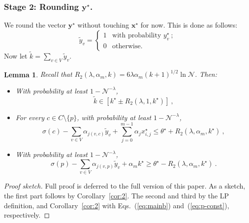 \documentclass[letterpaper]{article} %
\newtheorem{lemma}[theorem]{Lemma}
\theoremstyle{definition}
\newcommand{\NN}{\mathcal{N}}
\newcommand\vecc{\mathbf}
\begin{document}
\subsubsection{Stage 2: Rounding $\vecc{y^\star }$.}
We round the vector $\vecc{y^\star }$ without touching $\vecc{x^\star }$ for now. This is done as follows:
\begin{equation*}
\tilde{y}_v = \begin{cases}
1 & \text{with probability } y^\star _v\ ;\\
0 & \text{otherwise.}
\end{cases}
\end{equation*}
Now let $\tilde{k}=\sum_{v \in V}\tilde{y}_v$.
\begin{lemma}\label{eq:factor-b}
	 Recall that  $R_2(\lambda, \alpha_{m},k)= 6\lambda\alpha_{m} (k+1)^{1/2} \ln \NN $. Then:
	\begin{itemize}
		\item With probability at least $1-\NN^{-\lambda}$,
		\begin{equation*}
		\tilde{k} \in [k^\star  \pm R_2(\lambda, 1,k^\star)]\ ,
		\end{equation*}
		\item For every $c \in C\setminus\{p\}$, with probability at least $1-\NN^{-\lambda}$,
		\begin{equation*}
		\sigma(c) - \sum_{v \in V}\alpha_{j(v,c)} \tilde{y}_{v} + \sum_{j=0}^{m-1}\alpha_j x^{\star }_{i,j}
		\leq \theta^\star  +  R_2(\lambda, \alpha_{m},k^\star)\ ,
		\end{equation*}
		\item With probability at least $1-\NN^{-\lambda}$,
		\begin{equation*}
		\sigma(p) - \sum_{v \in V}\alpha_{j(v,p)} \tilde{y}_{v} + \alpha_m k^\star \geq \theta^\star -  R_2(\lambda, \alpha_{m},k^\star)\ .
		\end{equation*}
	\end{itemize}

\end{lemma}
\begin{proof}[Proof sketch] Full proof is deferred to the full version of this paper. As a sketch,
	the first part follows by Corollary~\ref{cor:2}. The second and third by the LP definition, and Corollary~\ref{cor:2} with Eqs.~(\ref{eq:mainb}) and~(\ref{eq:p-const}), respectively.
\end{proof}
\end{document}
